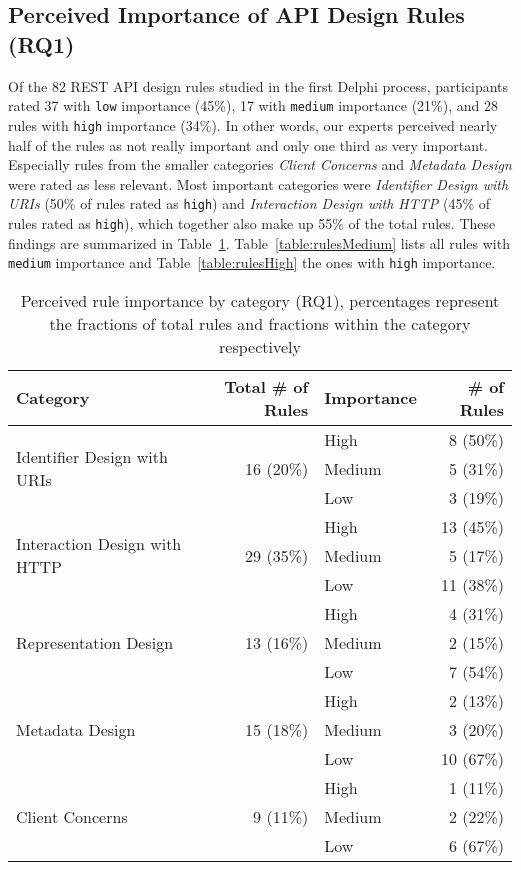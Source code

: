 \documentclass[runningheads]{llncs}
\begin{document}
\subsection{Perceived Importance of API Design Rules (RQ1)}
Of the 82 REST API design rules studied in the first Delphi process, participants rated 37 with \texttt{low} importance (45\%), 17 with \texttt{medium} importance (21\%), and 28 rules with \texttt{high} importance (34\%).
In other words, our experts perceived nearly half of the rules as not really important and only one third as very important.
Especially rules from the smaller categories \textit{Client Concerns} and \textit{Metadata Design} were rated as less relevant.
Most important categories were \textit{Identifier Design with URIs} (50\% of rules rated as \texttt{high}) and \textit{Interaction Design with HTTP} (45\% of rules rated as \texttt{high}), which together also make up 55\% of the total rules.
These findings are summarized in Table~\ref{table:category-importance}.
Table~\ref{table:rulesMedium} lists all rules with \texttt{medium} importance and Table~\ref{table:rulesHigh} the ones with \texttt{high} importance.

\begin{table}
    \centering
	\caption{Perceived rule importance by category (RQ1), percentages represent the fractions of total rules and fractions within the category respectively}
	\label{table:category-importance}
	\begin{tabular}{lrlr}
		Category & Total \# of Rules & Importance & \# of Rules\\
		\hline
		\hline
		\multirow{3}{*}{Identifier Design with URIs} & \multirow{3}{*}{16 (20\%)} & High & 8 (50\%)\\
		 & & Medium & 5 (31\%)\\
		 & & Low & 3 (19\%)\\
		\hline
		\multirow{3}{*}{Interaction Design with HTTP} & \multirow{3}{*}{29 (35\%)} & High & 13 (45\%) \\
		 & & Medium & 5 (17\%)\\
		 & & Low & 11 (38\%)\\
		\hline
		\multirow{3}{*}{Representation Design} & \multirow{3}{*}{13 (16\%)} & High & 4 (31\%)\\
		 & & Medium & 2 (15\%)\\
		 & & Low & 7 (54\%)\\
		\hline
		\multirow{3}{*}{Metadata Design} & \multirow{3}{*}{15 (18\%)} & High & 2 (13\%)\\
		 & & Medium & 3 (20\%)\\
		 & & Low & 10 (67\%)\\
		\hline
		\multirow{3}{*}{Client Concerns} & \multirow{3}{*}{9 (11\%)} & High & 1 (11\%)\\
		 & & Medium & 2 (22\%)\\
		 & & Low & 6 (67\%)\\
		\hline
	\end{tabular}
\end{table}
\end{document}
